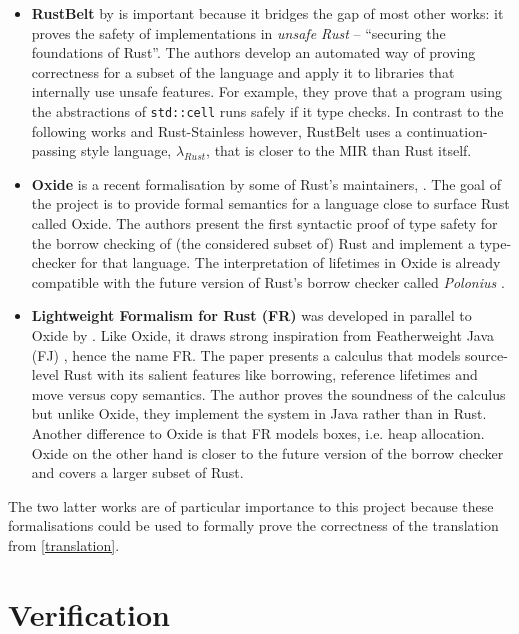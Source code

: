 \begin{itemize}
\item \textbf{RustBelt} by \citet{rustbelt} is important because it bridges the
gap of most other works: it proves the safety of implementations in \emph{unsafe
Rust} -- ``securing the foundations of Rust''. The authors develop an automated
way of proving correctness for a subset of the language and apply it to
libraries that internally use unsafe features. For example, they prove that a
program using the abstractions of \passthrough{\lstinline!std::cell!} runs
safely if it type checks. In contrast to the following works and Rust-Stainless
however, RustBelt uses a continuation-passing style language,
\(\lambda_{Rust}\), that is closer to the MIR than Rust itself.

\item \textbf{Oxide} is a recent formalisation by some of Rust's maintainers,
\citet{oxide}. The goal of the project is to provide formal semantics for a
language close to surface Rust called Oxide. The authors present the first
syntactic proof of type safety for the borrow checking of (the considered subset
of) Rust and implement a type-checker for that language. The interpretation of
lifetimes in Oxide is already compatible with the future version of Rust's
borrow checker called \emph{Polonius} \cite{polonius}.

\item \textbf{Lightweight Formalism for Rust (FR)} was developed in parallel to
Oxide by \citet{fr}. Like Oxide, it draws strong inspiration from Featherweight
Java (FJ) \cite{fj}, hence the name FR. The paper presents a calculus that
models source-level Rust with its salient features like borrowing, reference
lifetimes and move versus copy semantics. The author proves the soundness of the
calculus but unlike Oxide, they implement the system in Java rather than in
Rust. Another difference to Oxide is that FR models boxes, i.e. heap allocation.
Oxide on the other hand is closer to the future version of the borrow checker
and covers a larger subset of Rust.
\end{itemize}

The two latter works are of particular importance to this project because these
formalisations could be used to formally prove the correctness of the
translation from \autoref{translation}.

\section{Verification}

